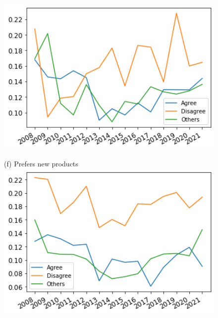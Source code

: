 \documentclass[12pt]{article}
\begin{document}
\begin{figure}[h!!]
\begin{minipage}[h!!]{0.32\textwidth}
		\includegraphics[width=1\textwidth]{../codding_data/results/liss/broad_groups_work_redcuctionqk20a144_actual.png}
	\end{minipage}
	\begin{minipage}[h!!]{0.32\textwidth}  
		\centering\footnotesize{(f) Prefers new products}
		\includegraphics[width=1\textwidth]{../codding_data/results/liss/broad_groups_work_redcuctionqk20a148_actual.png}
	\end{minipage}
\end{figure}

\clearpage
\newpage
\end{document}
